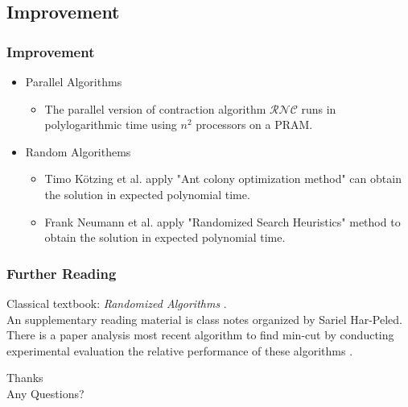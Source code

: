 \documentclass[compress,blue]{beamer}
\begin{document}
	\subsection{Improvement}
	\begin{frame}[c]
	\frametitle{Improvement}
	\begin{itemize}
	\item Parallel Algorithms
		\begin{itemize}
			\item The parallel version of contraction algorithm $ \mathcal{RNC} $ runs in polylogarithmic time using $ n^2 $ processors on a PRAM.
		\end{itemize}
	\pause
	\item Random Algorithems
		\begin{itemize}
		\item Timo Kötzing et al. apply "Ant colony optimization method" can obtain the solution in expected polynomial time.
		\item Frank Neumann et al. apply "Randomized Search Heuristics" method to obtain the solution in expected polynomial time.
		\end{itemize}
	\end{itemize}
	\end{frame}
	
	\begin{frame}[c]
	\frametitle{Further Reading}
	
	Classical textbook: \textit{Randomized Algorithms} .\\
	\vspace{2em}
	An supplementary reading material is class notes organized by Sariel Har-Peled.\\
	\vspace{2em}
	There is a paper analysis most recent algorithm to find min-cut by conducting experimental evaluation the relative performance of these algorithms {\footnotesize{}}. 
	\end{frame}
	
	\begin{frame}[c]
	\begin{center}
	{\LARGE Thanks}
	\\
	Any Questions?
	\end{center}
	
	\end{frame}
	
\end{document}
